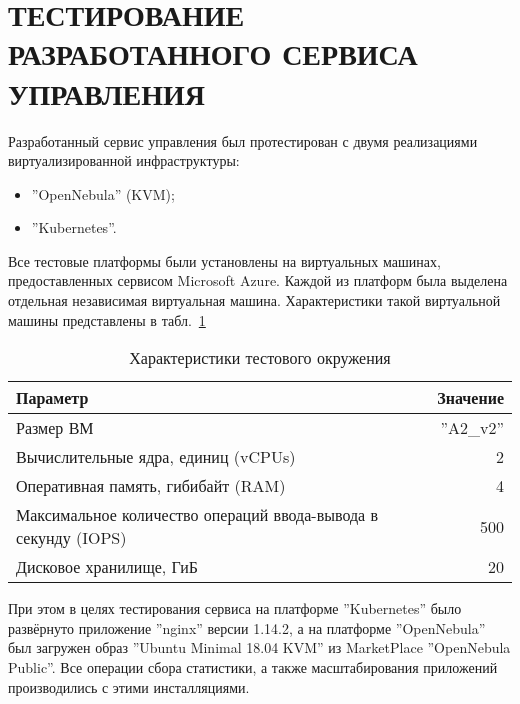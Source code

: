 \section[ТЕСТИРОВАНИЕ РАЗРАБОТАННОГО \\ СЕРВИСА УПРАВЛЕНИЯ]{ТЕСТИРОВАНИЕ РАЗРАБОТАННОГО СЕРВИСА УПРАВЛЕНИЯ}
Разработанный сервис управления был протестирован с двумя реализациями виртуализированной инфраструктуры:
\begin{itemize}
    \item ''OpenNebula'' (KVM);
    \item ''Kubernetes''.
\end{itemize}
Все тестовые платформы были установлены на виртуальных машинах, предоставленных сервисом Microsoft Azure.
Каждой из платформ была выделена отдельная независимая виртуальная машина. Характеристики такой виртуальной машины представлены в табл.~\ref{a2-characteristics}
\begin{table}[hbtp]
    \begin{tabularx}{\textwidth}{X r}
        \textbf{Параметр} & \textbf{Значение} \\
        \hline
        Размер ВМ & ''A2\_v2'' \\
        \hline
        Вычислительные ядра, единиц (vCPUs) & 2 \\
        \hline
        Оперативная память, гибибайт (RAM) & 4 \\
        \hline
        Максимальное количество операций ввода-вывода в секунду (IOPS) & 500 \\
        \hline
        Дисковое хранилище, ГиБ & 20 \\
    \end{tabularx}
    \caption{Характеристики тестового окружения}
    \label{a2-characteristics}
\end{table}

При этом в целях тестирования сервиса на платформе ''Kubernetes'' было развёрнуто приложение ''nginx'' версии 1.14.2, а на платформе ''OpenNebula'' был загружен образ ''Ubuntu Minimal 18.04 KVM'' из MarketPlace ''OpenNebula Public''.
Все операции сбора статистики, а также масштабирования приложений производились с этими инсталляциями.